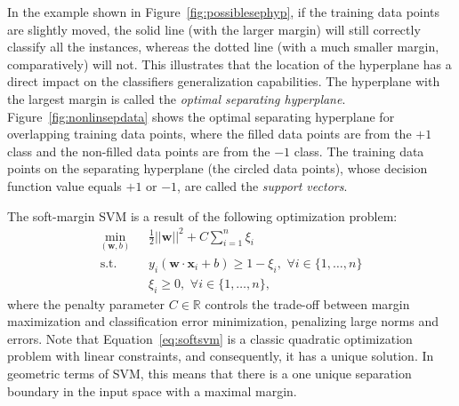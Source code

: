 \documentclass[reqno]{vcuthesis}
\newcommand{\reals}{{\mathbb{R}}}
\numberwithin{equation}{chapter}
\begin{document}
In the example shown in Figure~\ref{fig:possiblesephyp}, if the training data points are slightly moved, the solid line (with the larger margin) will still correctly classify all the instances, whereas the dotted line (with a much smaller margin, comparatively) will not. This illustrates that the location of the hyperplane has a direct impact on the classifiers generalization capabilities. The hyperplane with the largest margin is called the \textit{optimal separating hyperplane}. Figure~\ref{fig:nonlinsepdata} shows the optimal separating hyperplane for overlapping training data points, where the filled data points are from the $+1$ class and the non-filled data points are from the $-1$ class. The training data points on the separating hyperplane (the circled data points), whose decision function value equals $+1$ or $-1$, are called the \textit{support vectors}. 

The soft-margin SVM is a result of the following optimization problem:
\begin{equation}
\label{eq:softsvm}
\begin{aligned}
\min\limits_{(\bm{w},b)} &{\,\,\,\,} \frac{1}{2}||\bm{w}||^2 + C\sum_{i=1}^n \xi_i \\
\text{s.t.} & {\,\,\,\,} y_i\left( \bm{w} \cdot \bm{x}_i + b\right) \geq 1 - \xi_i, {\,\,} \forall i \in \{1,\ldots,n\} \\
 & {\,\,\,\,} \xi_i \geq 0, {\,\,} \forall i \in \{1,\ldots,n\},
\end{aligned}
\end{equation}
where the penalty parameter $C \in \reals$ controls the trade-off between margin maximization and classification error minimization, penalizing large norms and errors. Note that Equation~\ref{eq:softsvm} is a classic quadratic optimization problem with linear constraints, and consequently, it has a unique solution. In geometric terms of SVM, this means that there is a one unique separation boundary in the input space with a maximal margin.
\end{document}
